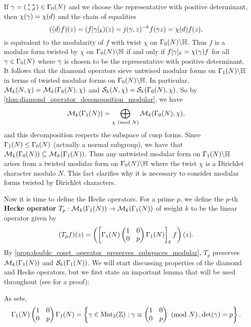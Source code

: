       If $\gamma = \begin{psmallmatrix} \ast & \ast \\ \ast & d \end{psmallmatrix} \in \Gamma_{0}(N)$ and we choose the representative with positive determinant, then $\chi(\gamma) = \chi(d)$ and the chain of equalities
      \[
        (\langle d\rangle f)(z) = (f[\gamma]_{k})(z) = j(\gamma,z)^{-k}f(\gamma z) = \chi(d)f(z),
      \]
      is equivalent to the modularity of $f$ with twist $\chi$ on $\Gamma_{0}(N)\backslash\mathbb{H}$. Thus $f$ is a modular form twisted by $\chi$ on $\Gamma_{0}(N)\backslash\mathbb{H}$ if and only if $f[\gamma]_{k} = \chi(\gamma)f$ for all $\gamma \in \Gamma_{0}(N)$ where $\gamma$ is chosen to be the representative with positive determinant. It follows that the diamond operators sieve untwised modular forms on $\Gamma_{1}(N)\backslash\mathbb{H}$ in terms of twisted modular forms on $\Gamma_{0}(N)\backslash\mathbb{H}$. In particular, $\mathcal{M}_{k}(N,\chi) = \mathcal{M}_{k}(\Gamma_{0}(N),\chi)$ and $\mathcal{S}_{k}(N,\chi) = \mathcal{S}_{k}(\Gamma_{0}(N),\chi)$. So by \cref{thm:diamond_operator_decomposition_modular}, we have
      \[
        \mathcal{M}_{k}(\Gamma_{1}(N)) = \bigoplus_{\chi \ \left(\text{mod }N\right)}\mathcal{M}_{k}(\Gamma_{0}(N),\chi),
      \]
      and this decomposition respects the subspace of cusp forms. Since $\Gamma_{1}(N) \le \Gamma_{0}(N)$ (actually a normal subgroup), we have that $\mathcal{M}_{k}(\Gamma_{0}(N)) \subseteq \mathcal{M}_{k}(\Gamma_{1}(N))$. Thus any untwisted modular form on $\Gamma_{1}(N)\backslash\mathbb{H}$ arises from a twisted modular form on $\Gamma_{0}(N)\backslash\mathbb{H}$ where the twist $\chi$ is a Dirichlet character modulo $N$. This fact clarifies why it is necessary to consider modular forms twisted by Dirichlet characters.

      Now it is time to define the Hecke operators. For a prime $p$, we define the $p$-th \textbf{Hecke operator} $T_{p}:\mathcal{M}_{k}(\Gamma_{1}(N)) \to \mathcal{M}_{k}(\Gamma_{1}(N))$ of weight $k$ to be the linear operator given by
      \[
        (T_{p}f)(z) = \left(\left[\Gamma_{1}(N)\begin{pmatrix} 1 & 0 \\ 0 & p \end{pmatrix}\Gamma_{1}(N)\right]_{k}f\right)(z).
      \]
      By \cref{prop:double_coset_operator_preserves_subspaces_modular}, $T_{p}$ preserves $\mathcal{M}_{k}(\Gamma_{1}(N))$ and $\mathcal{S}_{k}(\Gamma_{1}(N))$. We will start discussing properties of the diamond and Hecke operators, but we first state an important lemma that will be used throughout (see \cite{diamond2005first} for a proof):

      \begin{lemma}\label{lem:cosets_for_Hecek_operators}
        As sets,
        \[
          \Gamma_{1}(N)\begin{pmatrix} 1 & 0 \\ 0 & p \end{pmatrix}\Gamma_{1}(N) = \left\{\gamma \in \mathrm{Mat}_{2}(\mathbb{Z}):\gamma \equiv \begin{pmatrix} 1 & 0 \\ 0 & p \end{pmatrix} \ \left(\text{mod }N\right), \det(\gamma) = p\right\}.
        \]
      \end{lemma}
      
